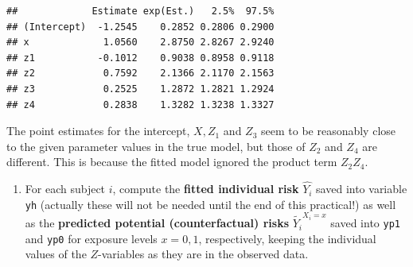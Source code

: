 \documentclass[
]{book}
\newenvironment{Shaded}{\begin{snugshade}}{\end{snugshade}}
\newcommand{\AttributeTok}[1]{\textcolor[rgb]{0.13,0.29,0.53}{#1}}
\newcommand{\CommentTok}[1]{\textcolor[rgb]{0.56,0.35,0.01}{\textit{#1}}}
\newcommand{\DecValTok}[1]{\textcolor[rgb]{0.00,0.00,0.81}{#1}}
\newcommand{\FunctionTok}[1]{\textcolor[rgb]{0.13,0.29,0.53}{\textbf{#1}}}
\newcommand{\NormalTok}[1]{#1}
\newcommand{\OtherTok}[1]{\textcolor[rgb]{0.56,0.35,0.01}{#1}}
\newcommand{\SpecialCharTok}[1]{\textcolor[rgb]{0.81,0.36,0.00}{\textbf{#1}}}
\newcommand{\StringTok}[1]{\textcolor[rgb]{0.31,0.60,0.02}{#1}}
\providecommand{\tightlist}{%
  \setlength{\itemsep}{0pt}\setlength{\parskip}{0pt}}
\theoremstyle{definition}
\theoremstyle{definition}
\theoremstyle{definition}
\theoremstyle{definition}
\theoremstyle{remark}
\begin{document}
\begin{verbatim}
##             Estimate exp(Est.)   2.5%  97.5%
## (Intercept)  -1.2545    0.2852 0.2806 0.2900
## x             1.0560    2.8750 2.8267 2.9240
## z1           -0.1012    0.9038 0.8958 0.9118
## z2            0.7592    2.1366 2.1170 2.1563
## z3            0.2525    1.2872 1.2821 1.2924
## z4            0.2838    1.3282 1.3238 1.3327
\end{verbatim}

The point estimates for the intercept, \(X, Z_1\) and \(Z_3\) seem to be
reasonably close to the given parameter values in the true model, but
those of \(Z_2\) and \(Z_4\) are different. This is because the fitted model
ignored the product term \(Z_2 Z_4\).

\begin{enumerate}
\def\labelenumi{\arabic{enumi}.}
\setcounter{enumi}{1}
\tightlist
\item
  For each subject \(i\), compute the \textbf{fitted individual risk}
  \(\widehat{Y_i}\) saved into variable \texttt{yh} (actually these will not be
  needed until the end of this practical!) as well as the
  \textbf{predicted potential (counterfactual) risks}
  \(\widetilde{Y_i}^{X_i=x}\) saved into \texttt{yp1} and \texttt{yp0} for exposure
  levels \(x=0,1\), respectively, keeping the individual values of the
  \(Z\)-variables as they are in the observed data.
\end{enumerate}

\begin{Shaded}
\end{Shaded}
\end{document}
